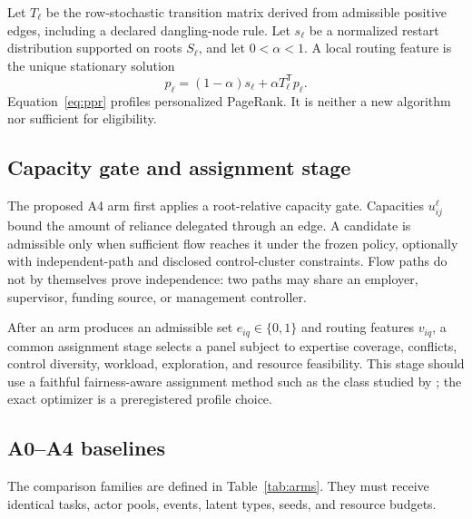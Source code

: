 \documentclass[11pt]{article}
\begin{document}
Let $T_\ell$ be the row-stochastic transition matrix derived from admissible positive edges, including a declared dangling-node rule.  Let $s_\ell$ be a normalized restart distribution supported on roots $S_\ell$, and let $0<\alpha<1$.  A local routing feature is the unique stationary solution
\begin{equation}
 p_\ell=(1-\alpha)s_\ell+\alpha T_\ell^{\mathsf T}p_\ell.
 \label{eq:ppr}
\end{equation}
Equation~\eqref{eq:ppr} profiles personalized PageRank.  It is neither a new algorithm nor sufficient for eligibility.

\subsection{Capacity gate and assignment stage}

The proposed A4 arm first applies a root-relative capacity gate.  Capacities $u_{ij}^\ell$ bound the amount of reliance delegated through an edge.  A candidate is admissible only when sufficient flow reaches it under the frozen policy, optionally with independent-path and disclosed control-cluster constraints.  Flow paths do not by themselves prove independence: two paths may share an employer, supervisor, funding source, or management controller.

After an arm produces an admissible set $e_{iq}\in\{0,1\}$ and routing features $v_{iq}$, a common assignment stage selects a panel subject to expertise coverage, conflicts, control diversity, workload, exploration, and resource feasibility.  This stage should use a faithful fairness-aware assignment method such as the class studied by \citet{stelmakh2021peerreview4all}; the exact optimizer is a preregistered profile choice.

\subsection{A0--A4 baselines}

The comparison families are defined in Table~\ref{tab:arms}.  They must receive identical tasks, actor pools, events, latent types, seeds, and resource budgets.
\end{document}
